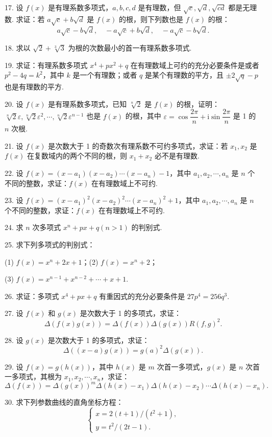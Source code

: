 \documentclass[UTF8,12pt,a4paper,fontset=fandol]{ctexart}
\begin{document}
17. 设 $f(x)$ 是有理系数多项式，$a,b,c,d$ 是有理数，但 $\sqrt c,\sqrt d,\sqrt{cd}$ 都是无理数. 求证：若 $a\sqrt c+b\sqrt d$ 是 $f(x)$ 的根，则下列数也是 $f(x)$ 的根：
\[
a\sqrt c-b\sqrt d,\quad -a\sqrt c+b\sqrt d,\quad -a\sqrt c-b\sqrt d.
\]

18. 求以 $\sqrt2+\sqrt[3]{3}$ 为根的次数最小的首一有理系数多项式.

19. 求证：有理系数多项式 $x^4+px^2+q$ 在有理数域上可约的充分必要条件是或者 $p^2-4q=k^2$，其中 $k$ 是一个有理数；或者 $q$ 是某个有理数的平方，且 $\pm2\sqrt q-p$ 也是有理数的平方.

20. 设 $f(x)$ 是有理系数多项式，已知 $\sqrt[n]{2}$ 是 $f(x)$ 的根，证明：$\sqrt[n]{2}\varepsilon,\sqrt[n]{2}\varepsilon^2,\cdots,\sqrt[n]{2}\varepsilon^{n-1}$ 也是 $f(x)$ 的根，其中 $\varepsilon=\cos\dfrac{2\pi}{n}+\mathrm{i}\sin\dfrac{2\pi}{n}$ 是 1 的 $n$ 次根.

21. 设 $f(x)$ 是次数大于 1 的奇数次有理系数不可约多项式，求证：若 $x_1,x_2$ 是 $f(x)$ 在复数域内的两个不同的根，则 $x_1+x_2$ 必不是有理数.

22. 设 $f(x)=(x-a_1)(x-a_2)\cdots(x-a_n)-1$，其中 $a_1,a_2,\cdots,a_n$ 是 $n$ 个不同的整数，求证：$f(x)$ 在有理数域上不可约.

23. 设 $f(x)=(x-a_1)^2(x-a_2)^2\cdots(x-a_n)^2+1$，其中 $a_1,a_2,\cdots,a_n$ 是 $n$ 个不同的整数，求证：$f(x)$ 在有理数域上不可约.

24. 求 $n$ 次多项式 $x^n+px+q(n>1)$ 的判别式.

25. 求下列多项式的判别式：

(1) $f(x)=x^n+2x+1$；\qquad (2) $f(x)=x^n+2$；

(3) $f(x)=x^{n-1}+x^{n-2}+\cdots+x+1$.

26. 求证：多项式 $x^4+px+q$ 有重因式的充分必要条件是 $27p^4=256q^3$.

27. 设 $f(x)$ 和 $g(x)$ 是次数大于 1 的多项式，求证：
\[
\Delta(f(x)g(x))=\Delta(f(x))\Delta(g(x))R(f,g)^2.
\]

28. 设 $g(x)$ 是次数大于 1 的多项式，求证：
\[
\Delta((x-a)g(x))=g(a)^2\Delta(g(x)).
\]

29. 设 $f(x)=g(h(x))$，其中 $h(x)$ 是 $m$ 次首一多项式，$g(x)$ 是 $n$ 次首一多项式，其根为 $x_1,x_2,\cdots,x_n$，求证：
\[
\Delta(f(x))=\Delta(g(x))^m\Delta(h(x)-x_1)\Delta(h(x)-x_2)\cdots\Delta(h(x)-x_n).
\]

30. 求下列参数曲线的直角坐标方程：
\[
\begin{cases}
x=2(t+1)/(t^2+1),\\
y=t^2/(2t-1).
\end{cases}
\]
\end{document}
